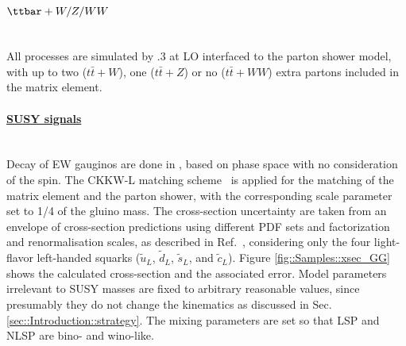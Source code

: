 \paragraph{\underline{$\ttbar+W/Z/WW$}}  \mbox{} \\
All processes are simulated by .3 at LO interfaced to the  parton shower model, 
with up to two ($t\bar{t}+W$), one ($t\bar{t}+Z$) or no ($t\bar{t}+WW$) extra partons included in the matrix element.  


\paragraph{\underline{SUSY signals}} \label{sec::Samples::SUSY}  \mbox{} \\
Decay of EW gauginos are done in \pythia , based on phase space with no consideration of the spin.
The CKKW-L matching scheme~\cite{CKKW} is applied for the matching of the matrix element and the parton shower, with the corresponding scale parameter set to 1/4 of the gluino mass. 
The cross-section uncertainty are taken from an envelope of cross-section predictions using different PDF sets and factorization and renormalisation scales, as described in Ref.~\cite{Borschensky:2014cia}, considering only the four light-flavor left-handed squarks ($\tilde{u}_L$, $\tilde{d}_L$, $\tilde{s}_L$, and $\tilde{c}_L$). Figure \ref{fig::Samples::xsec_GG} shows the calculated cross-section and the associated error. Model parameters irrelevant to SUSY masses are fixed to arbitrary reasonable values, 
since presumably they do not change the kinematics as discussed in Sec. \ref{sec::Introduction::strategy}.
The mixing parameters are set so that LSP and NLSP are bino- and wino-like. \\


